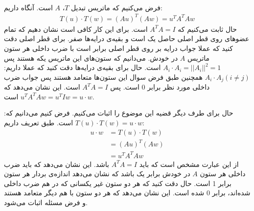 \\
فرض می‌کنیم که ماتریس تبدیل
$T$، $A$
است. آنگاه داریم:
\begin{gather*}
    T(u) \cdot T(w) = (Au)^T(Aw) = u^TA^TAw
\end{gather*}
حال ثابت می‌کنیم که
$A^TA = I$
است. برای این کار کافی است نشان دهیم که تمام عضو‌های روی قطر اصلی حاصل یک است و بقیه‌ی درایه‌ها صفر.
برای قطر اصلی دقت کنید که عملا جواب درایه بر روی قطر اصلی برابر است با ضرب داخلی هر ستون ماتریس
$A$
در خودش. می‌دانیم که ستون‌های این ماتریس یکه هستند پس
$A_i \cdot A_i = ||A_i||^2 = 1$
است. حال برای بقیه‌ی درایه‌ها دقت کنید که عملا داریم:
$A_i \cdot A_j (i \neq j)$
همچنین طبق فرض سوال این ستون‌ها متعامد هستند پس جواب ضرب داخلی مورد نظر برابر 0 است.
پس
$A^TA = I$
است. این نشان می‌دهد که
$u^TA^TAw = u^T I w = u \cdot w$
است.

\noindent
حال برای طرف دیگر قضیه این موضوع را اثبات می‌کنیم. فرض کنیم می‌دانیم که:
$T(u) \cdot T(w) = u \cdot w$
است. طبق تعریف داریم:
\begin{align*}
    u \cdot w & = T(u) \cdot T(w)\\
    & = (Au)^T(Aw)\\
    & = u^TA^TAw
\end{align*}
از این عبارت مشخص است که باید
$A^TA = I$
باشد. این نشان می‌دهد که باید ضرب داخلی هر ستون
$A$
در خودش برابر یک باشد که نشان می‌دهد اندازه‌ی بردار هر ستون برابر 1 است.
حال دقت کنید که هر دو ستون غیر یکسانی که در هم ضرب داخلی شده‌اند، برابر 0 شده است.
این نشان می‌دهد که هر دو ستون با هم دیگر متعامد هستند و فرض مسئله اثبات می‌شود.